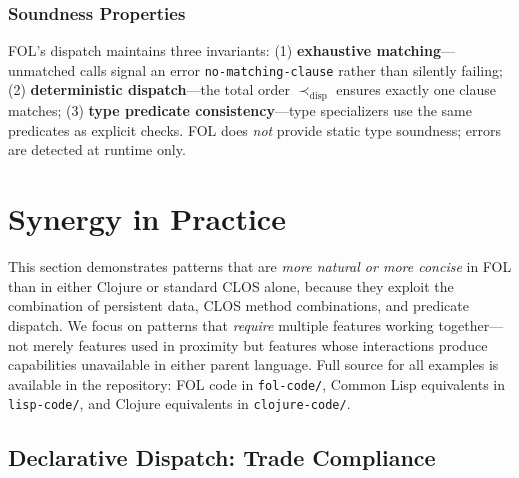 \documentclass[sigconf,nonacm,review]{acmart}
\begin{document}
\subsubsection{Soundness Properties}

FOL's dispatch maintains three invariants: (1) \textbf{exhaustive matching}---unmatched calls signal an error \texttt{no-matching-clause} rather than silently failing; (2) \textbf{deterministic dispatch}---the total
order $\prec_{\text{disp}}$ ensures exactly one clause matches; (3) \textbf{type predicate consistency}---type specializers use the same predicates as explicit checks. FOL does \textit{not} provide static type soundness;
errors are detected at runtime only.

\section{Synergy in Practice}

This section demonstrates patterns that are \textit{more natural or more concise} in FOL than in either Clojure or standard CLOS alone, because they exploit the combination of persistent data, CLOS method
combinations, and predicate dispatch. We focus on patterns that \textit{require} multiple features working together---not merely features used in proximity but features whose interactions produce capabilities
unavailable in either parent language. Full source for all examples is available in the repository: FOL code in \texttt{fol-code/}, Common Lisp equivalents in \texttt{lisp-code/}, and Clojure equivalents in \texttt{clojure-code/}.

\subsection{Declarative Dispatch: Trade Compliance}
\end{document}
